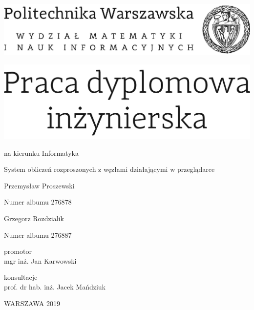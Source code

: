 \documentclass[12pt,twoside,a4paper]{article}
\newcommand{\discipline}{Informatyka}
\renewcommand{\title}{System obliczeń rozproszonych z węzłami działającymi w przeglądarce}
\newcommand{\supervisor}{mgr inż. Jan Karwowski}
\renewcommand{\year}{2019}
\newcommand{\authori}{Przemysław Proszewski}
\newcommand{\albumi}{276878}
\newcommand{\authorii}{Grzegorz Rozdzialik}
\newcommand{\albumii}{276887}
\begin{document}
\pagestyle{empty}

\begin{center}

\includegraphics[scale=1.]{img/politechnika} 
\vspace{40pt}

\includegraphics[scale=1.]{img/praca_inz}  %

{ \arial na kierunku \discipline

\vspace{30pt}
{\arial \large \title}

\vspace{40pt}

{\arial \huge \authori }

\vspace{5pt}

Numer albumu \albumi

\vspace {20pt}
{\arial \huge \authorii}

\vspace{5pt}

Numer albumu \albumii

\vspace{40pt}

promotor \\
{\arial \supervisor}

\vspace{15pt}
 
konsultacje  \\
{\arial prof. dr hab. inż. Jacek Mańdziuk }

 \vfill
WARSZAWA \year \\
}
\end{center}


%
%
\end{document}
